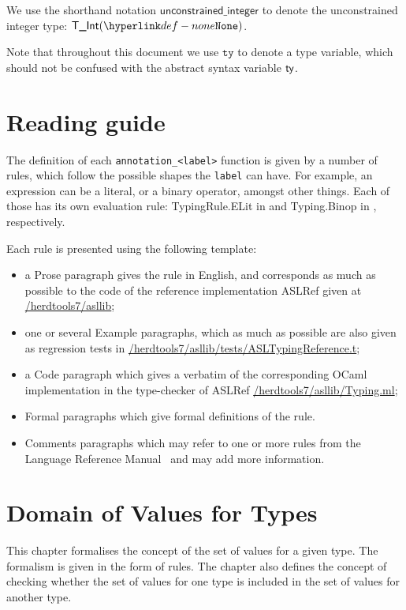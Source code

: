 \documentclass{book}
\newcommand\unconstrainedinteger[0]{\textsf{unconstrained\_integer}}
\newcommand\tty[0]{\texttt{ty}}
\begin{document}
We use the shorthand notation $\unconstrainedinteger$ to denote the unconstrained integer type: $\TInt(\None)$.

Note that throughout this document we use $\tty$ to denote a type variable, which should not be confused with the abstract syntax variable $\textsf{ty}$.

\chapter{Reading guide}

The definition of each \texttt{annotation\_<label>} function is given by a number of
rules, which follow the possible shapes the \texttt{label} can have. For
example, an expression can be a literal, or a binary operator, amongst other
things. Each of those has its own evaluation rule: TypingRule.ELit in
 and
Typing.Binop in , respectively.

Each rule is presented using the following template:
\begin{itemize}
\item a Prose paragraph gives the rule in English, and corresponds as much as possible to the code of the reference implementation ASLRef given at
\href{https://github.com/herd/herdtools7//tree/master/asllib}{/herdtools7/asllib};
\item one or several Example paragraphs, which as much as possible are also given as regression tests in
\href{https://github.com/herd/herdtools7//tree/master/asllib/tests/ASLTypingReference.t}{/herdtools7/asllib/tests/ASLTypingReference.t};
\ifcode
\item a Code paragraph which gives a verbatim of the corresponding OCaml implementation in the type-checker of ASLRef
\href{https://github.com/herd/herdtools7//tree/master/asllib/Typing.ml}{/herdtools7/asllib/Typing.ml};
\fi
\item Formal paragraphs which give formal definitions of the rule.
\item Comments paragraphs which may refer to one or more rules from the Language Reference Manual~\cite{LRM}
      and may add more information.
\end{itemize}

\chapter{Domain of Values for Types}
This chapter formalises the concept of the set of values for a given type.
The formalism is given in the form of rules.
%
The chapter also defines the concept of checking whether the set of values
for one type is included in the set of values for another type.
\end{document}
